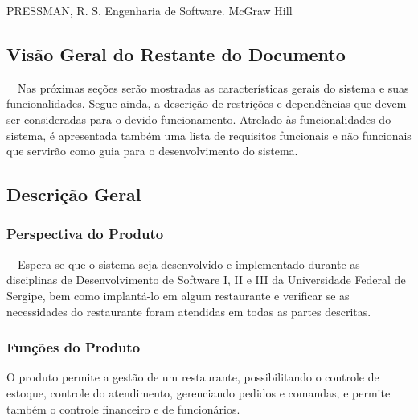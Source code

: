 {
\foreignlanguage{english}{\textcolor[rgb]{0.078431375,0.09411765,0.13725491}{PRESSMAN, R. S. Engenharia de Software.
}}\textcolor[rgb]{0.078431375,0.09411765,0.13725491}{McGraw Hill}}


\bigskip

\subsection[Visão Geral do Restante do Documento]{\textcolor[rgb]{0.078431375,0.09411765,0.13725491}{Visão Geral
do Restante do Documento}}
{
\textcolor[rgb]{0.078431375,0.09411765,0.13725491}{\ \ Nas próximas seções serão mostradas as características gerais do
sistema e suas funcionalidades. Segue ainda, a descrição de restrições e dependências que devem ser consideradas para o
devido funcionamento. Atrelado às funcionalidades do sistema, é apresentada também uma lista de requisitos funcionais e
não funcionais que servirão como guia para o desenvolvimento do sistema.}}


\bigskip

\clearpage\subsection[Descrição Geral]{\textbf{\textcolor[rgb]{0.078431375,0.09411765,0.13725491}{Descrição
Geral}}}
\subsubsection[Perspectiva do Produto]{\textcolor[rgb]{0.078431375,0.09411765,0.13725491}{Perspectiva do Produto}}
{
\textcolor[rgb]{0.078431375,0.09411765,0.13725491}{\ \ Espera-se que o sistema seja desenvolvido e implementado durante
as disciplinas de Desenvolvimento de Software I, II e III da Universidade Federal de Sergipe, bem como implantá-lo em
algum restaurante e verificar se as necessidades do restaurante foram atendidas em todas as partes descritas.}}

\subsubsection[Funções do Produto]{\textcolor[rgb]{0.078431375,0.09411765,0.13725491}{Funções do Produto}}
{
\textcolor[rgb]{0.078431375,0.09411765,0.13725491}{O produto permite a gestão de um restaurante, possibilitando o
controle de estoque, controle do atendimento, gerenciando pedidos e comandas, e permite também o controle financeiro e
de funcionários.}}


